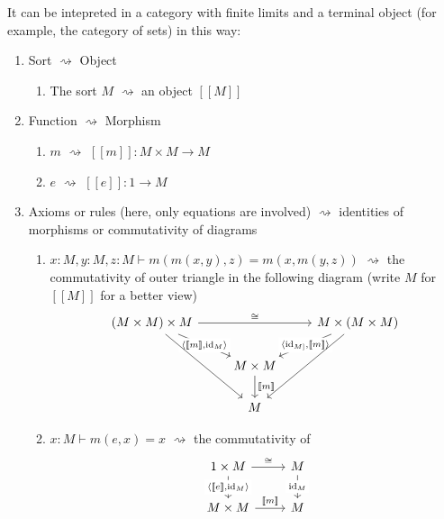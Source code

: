 It can be intepreted in a category with finite limits and a terminal object (for example, the category of sets) in this way:
\begin{enumerate}
    \item Sort $\rightsquigarrow$ Object
        \begin{enumerate}
            \item The sort $M$ $\rightsquigarrow$ an object $[\![M]\!]$
        \end {enumerate}
    \item Function $\rightsquigarrow$ Morphism
        \begin{enumerate}
            \item $m$ $\rightsquigarrow$ $[\![m]\!] : M\times M\to M$
            \item $e$ $\rightsquigarrow$ $[\![e]\!] : 1\to M$
        \end {enumerate}
    \item Axioms or rules (here, only equations are involved) $\rightsquigarrow$ identities of morphisms or commutativity of diagrams
        \begin{enumerate}
            \item $x:M,y:M,z:M\vdash m(m(x,y),z)=m(x,m(y,z))$ $\rightsquigarrow$ the commutativity of outer triangle in the following diagram (write $M$ for $[\![M]\!]$ for a better view)
            \[\begin{tikzcd}
                {(M\times M)\times M} && {M\times (M\times M)} \\
                & {M\times M} \\
                & M
                \arrow["{\langle [\![m]\!],\id_{M}\rangle}"{description}, from=1-1, to=2-2]
                \arrow["{[\![m]\!]}", from=2-2, to=3-2]
                \arrow["{\langle \id_{M]},[\![m]\!]\rangle}"{description}, from=1-3, to=2-2]
                \arrow["\cong", from=1-1, to=1-3]
                \arrow[from=1-1, to=3-2]
                \arrow[from=1-3, to=3-2]
            \end{tikzcd}\]
            \item $x:M\vdash m(e,x)=x$ $\rightsquigarrow$ the commutativity of  \[\begin{tikzcd}
                {1\times M} & M \\
                {M\times M} & M
                \arrow["{\langle [\![e]\!],\id_M \rangle}"{description}, from=1-1, to=2-1]
                \arrow["{[\![m]\!]}", from=2-1, to=2-2]
                \arrow["{\id_M}"{description}, from=1-2, to=2-2]
                \arrow["\cong", from=1-1, to=1-2]
            \end{tikzcd}\]
        \end {enumerate}
\end{enumerate}

\fi